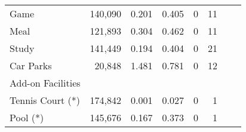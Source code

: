 \begin{table}[ht]
{\begin{threeparttable}
\begin{tabular}{lrrrrrrr}
Game                &140,090         &0.201  &0.405   &0    &11\\
Meal                &121,893         &0.304  &0.462   &0    &11\\
Study               &141,449         &0.194  &0.404   &0    &21\\
Car Parks           &20,848          &1.481  &0.781   &0    &12\\
\midrule
Add-on Facilities\\
\midrule
Tennis Court (*)    &174,842         &0.001  &0.027   &0    &1\\
Pool (*)            &145,676         &0.167  &0.373   &0    &1\\
\bottomrule\bottomrule
\end{tabular}
\end{threeparttable}}
\end{table}